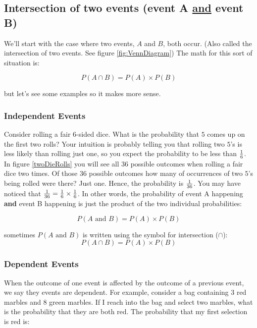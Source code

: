\subsection*{Intersection of two events (event A \underline{and} event B)}

We'll start with the case where two events, $A$ and $B$, both
occur. (Also called the intersection of two events. See figure \ref{fig:VennDiagram})
The math for this sort of situation is:

\begin{equation}
  P(A \cap B) = P(A)  \times P(B)\nonumber
\end{equation}

but let's see some examples so it makes more sense.


\subsubsection*{Independent Events}
Consider rolling a fair $6$-sided dice.  What is the probability that
$5$ comes up on the first two rolls?  Your intuition is probably telling
you that rolling two $5$'s is less likely than rolling just one, so
you expect the probability to be less than ${1\over 6}$.  In figure
\ref{twoDieRolls} you will see all 36 possible outcomes when rolling a
fair dice two times.  Of those 36 possible outcomes how many of
occurrences of two $5$'s being rolled were there?  Just one.  Hence,
the probability is ${1\over 36}$.  You may have noticed that
${1\over 36} = {1\over 6} \times {1\over 6}$.  In other words, the
probability of event A happening \textbf{and} event B happening is
just the product of the two individual probabilities:

\begin{equation}
  P(A\text{ and } B) = P(A) \times P(B)\nonumber
\end{equation}



sometimes $P(A\text{ and } B)$ is written using the symbol for
intersection ($\cap$):
\begin{equation}\label{eq:andprobability}
  P(A \cap B) = P(A) \times P(B)
\end{equation}




\subsubsection{Dependent Events}
When the outcome of one event is affected by the outcome of a previous
event, we say they events are dependent.  For example, consider a bag
containing $3$ red marbles and $8$ green marbles.  If I reach into the
bag and select two marbles, what is the probability that they are both
red.  The probability that my first selection is red is:

